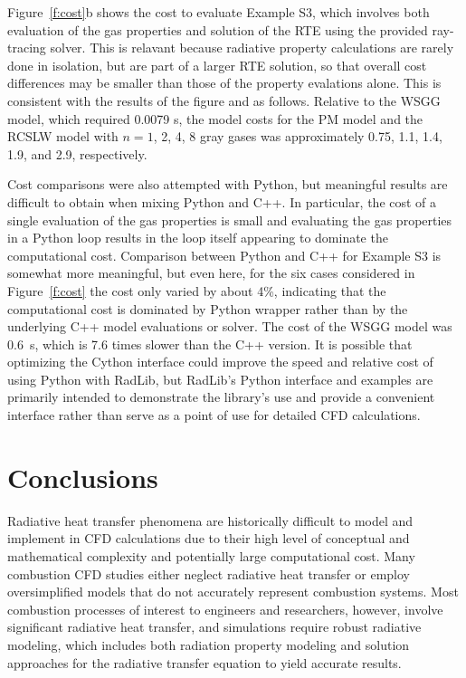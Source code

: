 \documentclass[preprint,12pt]{elsarticle}
\begin{document}
Figure~\ref{f:cost}b shows the cost to evaluate Example S3, which involves both evaluation of the gas properties and solution of the RTE using the provided ray-tracing solver. This is relavant because radiative property calculations are rarely done in isolation, but are part of a larger RTE solution, so that overall cost differences may be smaller than those of the property evalations alone. This is consistent with the results of the figure and as follows. Relative to the WSGG model, which required 0.0079 s, the model costs for the PM model and the RCSLW model with $n=1$, 2, 4, 8 gray gases was approximately 0.75, 1.1, 1.4, 1.9, and 2.9, respectively. 

Cost comparisons were also attempted with Python, but meaningful results are difficult to obtain when mixing Python and C++. In particular, the cost of a single evaluation of the gas properties is small and evaluating the gas properties in a Python loop results in the loop itself appearing to dominate the computational cost. Comparison between Python and C++ for Example S3 is somewhat more meaningful, but even here, for the six cases considered in Figure~\ref{f:cost} the cost only varied by about 4\%, indicating that the computational cost is dominated by Python wrapper rather than by the underlying C++ model evaluations or solver. The cost of the WSGG model was 0.6~s, which is 7.6 times slower than the C++ version. It is possible that optimizing the Cython interface could improve the speed and relative cost of using Python with RadLib, but RadLib's Python interface and examples are primarily intended to demonstrate the library's use and provide a convenient interface rather than serve as a point of use for detailed CFD calculations.


\section{Conclusions} \label{s:conclusions}

Radiative heat transfer phenomena are historically difficult to model and implement in CFD calculations due to their high level of conceptual and mathematical complexity and potentially large computational cost. Many combustion CFD studies either neglect radiative heat transfer or employ oversimplified models that do not accurately represent combustion systems. Most combustion processes of interest to engineers and researchers, however, involve significant radiative heat transfer, and simulations require robust radiative modeling, which includes both radiation property modeling and solution approaches for the radiative transfer equation to yield accurate results. 
\end{document}
